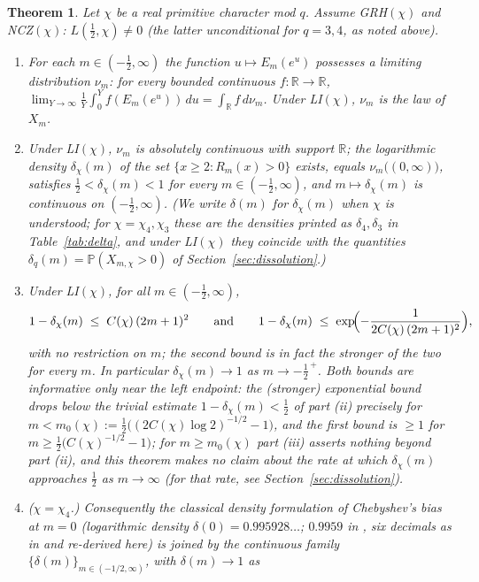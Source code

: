 \documentclass[11pt]{article}
\newtheorem{theorem}{Theorem}
\begin{document}
\begin{theorem}\label{thm:interp}
Let $\chi$ be a real primitive character mod $q$. Assume GRH$(\chi)$
and NCZ$(\chi)$: $L(\tfrac12,\chi)\ne0$ (the latter unconditional for
$q=3,4$, as noted above).
\begin{enumerate}
\item[(i)] For each $m\in(-\tfrac12,\infty)$ the function
$u\mapsto E_m(e^u)$ possesses a limiting distribution
$\nu_m$: for every bounded continuous $f:\mathbb R\to\mathbb R$,
$\lim_{Y\to\infty}\frac1Y\int_0^Y f(E_m(e^u))\,du
=\int_{\mathbb R}f\,d\nu_m$. Under LI$(\chi)$, $\nu_m$ is the law of
$X_m$.
\item[(ii)] Under LI$(\chi)$, $\nu_m$ is absolutely continuous with
support $\mathbb R$; the logarithmic density
$\delta_\chi(m)$ of the set $\{x\ge2: R_m(x)>0\}$ exists, equals
$\nu_m\bigl((0,\infty)\bigr)$, satisfies
$\tfrac12<\delta_\chi(m)<1$ for every $m\in(-\tfrac12,\infty)$, and
$m\mapsto\delta_\chi(m)$ is continuous on $(-\tfrac12,\infty)$. (We
write $\delta(m)$ for $\delta_\chi(m)$ when $\chi$ is understood; for
$\chi=\chi_4,\chi_3$ these are the densities printed as
$\delta_4,\delta_3$ in Table~\ref{tab:delta}, and under LI$(\chi)$
they coincide with the quantities
$\delta_q(m)=\mathbb P(X_{m,\chi}>0)$ of
Section~\ref{sec:dissolution}.)
\item[(iii)] Under LI$(\chi)$, for all $m\in(-\tfrac12,\infty)$,
\[
1-\delta_\chi(m)\;\le\;C(\chi)\,(2m+1)^2
\qquad\text{and}\qquad
1-\delta_\chi(m)\;\le\;\exp\!\Bigl(-\frac{1}{2C(\chi)\,(2m+1)^2}\Bigr),
\]
with no restriction on $m$; the second bound is in fact the stronger of
the two for every $m$. In particular $\delta_\chi(m)\to1$ as
$m\to-\tfrac12^{\,+}$. Both bounds are informative only near the left
endpoint: the (stronger) exponential bound drops below the trivial
estimate $1-\delta_\chi(m)<\tfrac12$ of part (ii) precisely for
$m<m_0(\chi):=\tfrac12\bigl((2C(\chi)\log2)^{-1/2}-1\bigr)$, and the
first bound is $\ge1$ for $m\ge\tfrac12\bigl(C(\chi)^{-1/2}-1\bigr)$;
for $m\ge m_0(\chi)$ part (iii) asserts nothing beyond part (ii), and
this theorem makes no claim about the rate at which $\delta_\chi(m)$
approaches $\tfrac12$ as $m\to\infty$ (for that rate, see
Section~\ref{sec:dissolution}).
\item[(iv)] ($\chi=\chi_4$.) Consequently the classical density
formulation of
Chebyshev's bias at $m=0$ (logarithmic density
$\delta(0)=0.995928\ldots$; $0.9959$ in \cite{RS94}, six decimals as in
\cite{FM13} and re-derived here) is joined by the continuous family
$\{\delta(m)\}_{m\in(-1/2,\infty)}$, with $\delta(m)\to1$ as

\end{enumerate}
\end{theorem}
\end{document}
